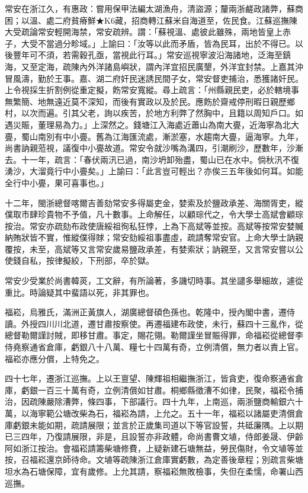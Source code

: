 \begin{pinyinscope}
常安在浙江久，有惠政：嘗用保甲法編太湖漁舟，清盜源；釐兩浙鹺政諸弊，蘇商困；以溫、處二府貧瘠鮮★K6藏，招商轉江蘇米自海道至，佐民食。江蘇巡撫陳大受疏論常安輕開海禁，常安疏辨。謂：「蘇視溫、處彼此雖殊，兩地皆皇上赤子，大受不當過分畛域。」上諭曰：「汝等以此而矛盾，皆為民耳，出於不得已。以後豐年可不須，若需穀孔亟，當視此行耳。」常安巡視寧波沿海諸地，泛海至鎮海，又至定海，疏陳內外洋諸島嶼狀，謂內洋宜招民廣墾，外洋宜封禁。上嘉其沖冒風濤，勤於王事。嘉、湖二府奸民迷誘民間子女，常安督吏捕治，悉獲諸奸民。上令視採生折割例從重定擬，飭常安寬縱。尋上疏言：「州縣親民吏，必於轄境事無繁簡、地無遠近莫不深知，而後有實政以及於民。應飭於齋戒停刑暇日親歷鄉村，以次而遍。引其父老，詢以疾苦，於地方利弊了然胸中，且籍以周知戶口。如遇災賑，董理易為力。」上深然之。錢塘江入海處近蕭山為南大亹，近海寧為北大亹，蜀山南別有中小亹。舊為江海匯流處，漸淤塞，水趨南大亹，逼海寧。九年，尚書訥親蒞視，議復中小亹故道。常安令就沙嘴為溝四，引潮刷沙，歷數年，沙漸去。十一年，疏言：「春伏兩汛已過，南沙坍卸殆盡，蜀山已在水中。倘秋汛不復湧沙，大溜竟行中小亹矣。」上諭曰：「此言豈可輕出？亦俟三五年後如何耳。如能全行中小亹，果可喜事也。」

十二年，閩浙總督喀爾吉善劾常安多得屬吏金，婪索及於鹽政承差、海關胥吏，縱僕取市肆珍貴物不予值，凡十數事。上命解任，以顧琮代之，令大學士高斌會顧琮按治。常安亦疏劾布政使唐綏祖徇私狂悖，上為下高斌等並按。高斌等按常安婪贓納賄狀皆不實，惟縱僕得賕；常安劾綏祖事盡虛，疏請奪常安官。上命大學士訥親覆按，未至，高斌等又言常安歲易鹽政承差，有婪索狀；訥親至，又言常安嘗以公使錢自私，按律擬絞，下刑部，卒於獄。

常安少受業於尚書韓菼，工文辭，有所論著，多譏切時事。其坐譴多舉細故，遽從重比。時論疑其中蜚語以死，非其罪也。

福崧，烏雅氏，滿洲正黃旗人，湖廣總督碩色孫也。乾隆中，授內閣中書，遷侍讀。外授四川川北道，遷甘肅按察使。再遷福建布政使，未行，蘇四十三亂作，從總督勒爾謹討賊，即移甘肅。事定，賜花翎。勒爾謹坐冒賑得罪，命福崧從總督李侍堯察通省倉庫，虧銀八十八萬、糧七十四萬有奇，立例清償，無力者以責上官。福崧亦應分償，上特免之。

四十七年，遷浙江巡撫。上以王亶望、陳輝祖相繼撫浙江，皆貪吏，復命察通省倉庫，虧銀一百三十萬有奇，立例清償如甘肅。桐鄉縣徵漕不如律，民聚，福崧令捕治，因疏陳嚴除漕弊，條四事，下部議行。四十九年，上南巡，兩浙鹽商輸銀六十萬，以海寧範公塘改柴為石，福崧為請，上允之。五十一年，福崧以諸屬吏清償倉庫虧銀未能如期，疏請展限；並言於正歲集司道以下等官設誓，共砥廉隅。上以期已三四年，乃復請展限，非是，且設誓亦非政體，命尚書曹文埴，侍郎姜晟、伊齡阿如浙江按治。會福崧請籌柴塘修費，上疑新建石塘無益，勞民傷財，令文埴等並按，召福崧還京師待命。文埴等疏陳浙江倉庫實虧數，為定善後章程；別疏言柴塘坦水為石塘保障，宜有歲修。上允其請，察福崧無敗檢事，失但在柔懦，命署山西巡撫。


\end{pinyinscope}
